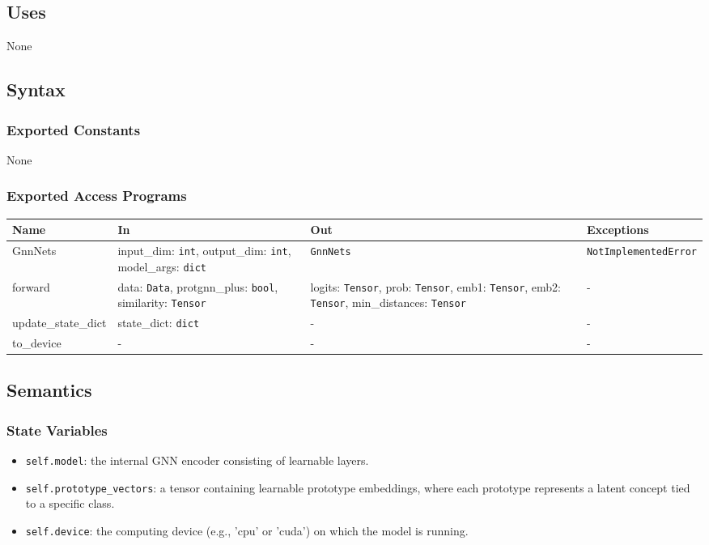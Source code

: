 \documentclass[12pt, titlepage]{article}
\begin{document}
\subsection{Uses}
None

\subsection{Syntax}

\subsubsection{Exported Constants}
None

\subsubsection{Exported Access Programs}

\begin{center}
\begin{tabular}{p{3cm} p{4.5cm} p{4.5cm} p{3cm}}
\hline
\textbf{Name} & \textbf{In} & \textbf{Out} & \textbf{Exceptions} \\
\hline
GnnNets & input\_dim: \texttt{int}, output\_dim: \texttt{int}, model\_args: \texttt{dict} & \texttt{GnnNets} & \texttt{NotImplementedError} \\
forward & data: \texttt{Data}, protgnn\_plus: \texttt{bool}, similarity: \texttt{Tensor} & logits: \texttt{Tensor}, prob: \texttt{Tensor}, emb1: \texttt{Tensor}, emb2: \texttt{Tensor}, min\_distances: \texttt{Tensor} & - \\
update\_state\_dict & state\_dict: \texttt{dict} & - & - \\
to\_device & - & - & - \\

\hline
\end{tabular}
\end{center}

\subsection{Semantics}

\subsubsection{State Variables}
\begin{itemize}
  \item \texttt{self.model}: the internal GNN encoder consisting of learnable layers.
  \item \texttt{self.prototype\_vectors}: a tensor containing learnable prototype embeddings, where each prototype represents a latent concept tied to a specific class.
  \item \texttt{self.device}: the computing device (e.g., 'cpu' or 'cuda') on which the model is running.
\end{itemize}
\end{document}
